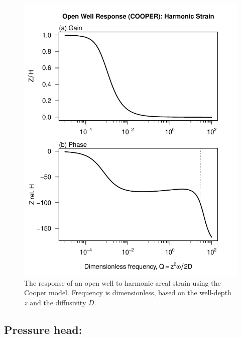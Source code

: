 \documentclass[12pt]{article}\usepackage[]{graphicx}\usepackage[]{color}
\makeatletter
\def\maxwidth{ %
  \ifdim\Gin@nat@width>\linewidth
    \linewidth
  \else
    \Gin@nat@width
  \fi
}
\newenvironment{knitrout}{}{} %
\makeatother
\begin{document}
\begin{figure}[htb!]
\begin{center}
\begin{knitrout}\small
{}\color{fgcolor}
\includegraphics[width=\maxwidth]{figure/COOPERRESPFIG} 

\end{knitrout}

\caption{The response of an open well to harmonic areal strain using
the Cooper model. 
Frequency is dimensionless, based on the well-depth $z$ and the diffusivity $D$.
}
\label{fig:owrsp-coop}
\end{center}
\end{figure}

\clearpage
\subsection{Pressure head: \citet{hsieh1987}}
\end{document}
